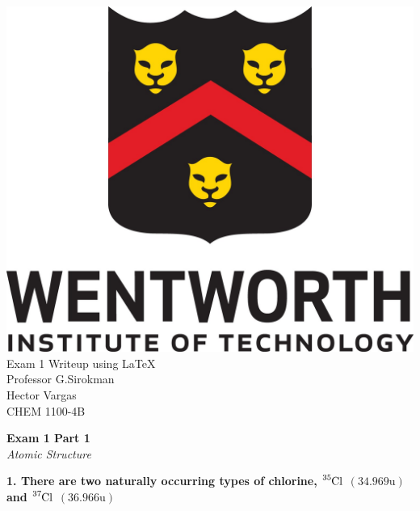 \documentclass{article}
\begin{document}
    \thispagestyle{empty}
    \begin{center}
        \includegraphics[scale=0.3]{wit_logo}\\[1cm]
        Exam 1 Writeup using  \LaTeX\\
        Professor G.Sirokman\\
        Hector Vargas\\
        CHEM 1100-4B
    \end{center}
    \pagebreak


    \begin{center}
        \textbf{Exam 1 Part 1}\\
        \textit{Atomic Structure}
    \end{center}
    \textbf{1. There are two naturally occurring types of chlorine, $\ce{^{35}Cl}$ $(34.969 \si{\atomicmassunit})$ and $\ce{^{37}Cl}$ $(36.966 \si{\atomicmassunit})$}
\end{document}
